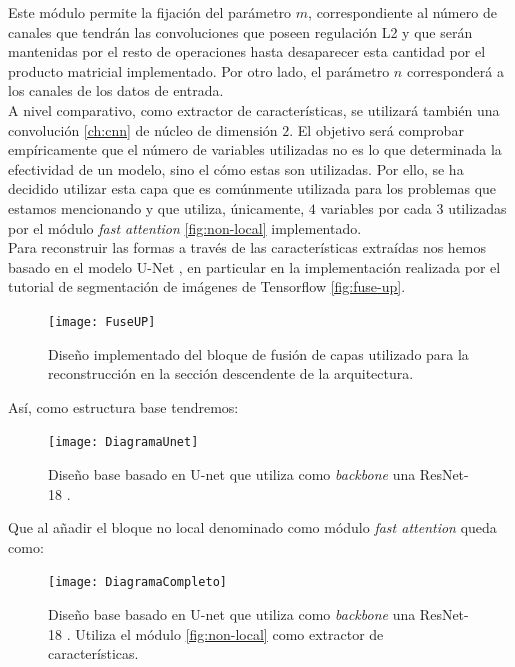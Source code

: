 Este módulo permite la fijación del parámetro $m$, correspondiente al número de canales que tendrán las convoluciones que poseen regulación L2 y que serán mantenidas por el resto de operaciones hasta desaparecer esta cantidad por el producto matricial implementado. Por otro lado, el parámetro $n$ corresponderá a los canales de los datos de entrada.\\

A nivel comparativo, como extractor de características, se utilizará también una convolución \autoref{ch:cnn} de núcleo de dimensión $2$. El objetivo será comprobar empíricamente que el número de variables utilizadas no es lo que determinada la efectividad de un modelo, sino el cómo estas son utilizadas. Por ello, se ha decidido utilizar esta capa que es comúnmente utilizada para los problemas que estamos mencionando y que utiliza, únicamente, $4$ variables por cada $3$ utilizadas por el módulo \emph{fast attention} \autoref{fig:non-local} implementado.\\

Para reconstruir las formas a través de las características extraídas nos hemos basado en el modelo U-Net \cite{2015arXiv150504597R}, en particular en la implementación realizada por el tutorial de segmentación de imágenes de Tensorflow \cite{tensorflowTutorial} \autoref{fig:fuse-up}.\\

\begin{figure}[h!]
  \centering
  \texttt{[image: FuseUP]}
  \caption{Diseño implementado del bloque de fusión de capas utilizado para la reconstrucción en la sección descendente de la arquitectura.}
  \label{fig:fuse-up}
\end{figure}

\newpage
Así, como estructura base tendremos:\\

\begin{figure}[h!]
  \centering
  \texttt{[image: DiagramaUnet]}
  \caption{Diseño base basado en U-net \cite{2015arXiv150504597R} que utiliza como \emph{backbone} una ResNet-18 \cite{DBLP:journals/corr/HeZRS15}.}
  \label{fig:DiagramaUnet}
\end{figure}

\newpage
Que al añadir el bloque no local denominado como módulo \emph{fast attention} queda como:\\

\begin{figure}[h]
  \centering
  \texttt{[image: DiagramaCompleto]}
  \caption{Diseño base basado en U-net \cite{2015arXiv150504597R} que utiliza como \emph{backbone} una ResNet-18 \cite{DBLP:journals/corr/HeZRS15}. Utiliza el módulo \autoref{fig:non-local} como extractor de características.}
  \label{fig:DiagramaCompleto}
\end{figure}

